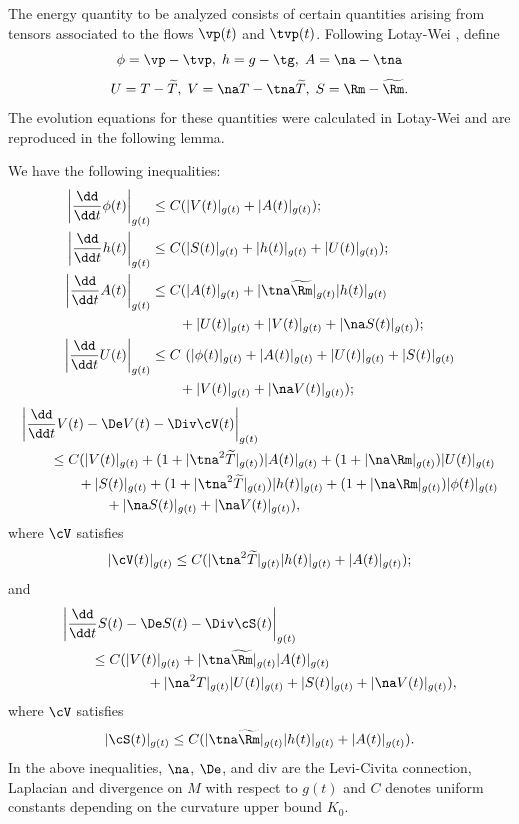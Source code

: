 \documentclass[hidelinks, 12pt, oneside, reqno]{amsart}
\begin{document}
The energy quantity to be analyzed consists of certain quantities arising from tensors associated to the flows $\vp(t)$ and $\tvp(t)$. Following Lotay-Wei \cite[\S 6.1]{LotayWeiLaplacianFlow}, define
\[
\phi = \vp - \tvp, \; h = g - \tg, \; A = \na - \tna 
\]
\[
U = T- \widetilde T, \; V = \na T - \tna \widetilde T, \; S = \Rm - \widetilde \Rm.
\]
The evolution equations for these quantities were calculated in Lotay-Wei and are reproduced in the following lemma.
\begin{lem}\label{lemma evolution equations differences}\cite[Lemma 6.2]{LotayWeiLaplacianFlow} We have the following inequalities:
\begin{align}
    \bigg| \frac{\dd }{\dd t} \phi(t) \bigg|_{g(t)} &\le C (|V(t)|_{g(t)} + |A(t)|_{g(t)}); \label{equation ev diff g2 structures} \\
    \bigg| \frac{\dd }{\dd t} h(t) \bigg|_{g(t)} &\le C (|S(t)|_{g(t)} +|h(t)|_{g(t)} + |U(t)|_{g(t)}); \label{equation ev diff metrics} \\
    \bigg| \frac{\dd }{\dd t} A(t) \bigg|_{g(t)} &\le C(|A(t)|_{g(t)} +|\tna \widetilde \Rm|_{g(t)}|h(t)|_{g(t)} \nonumber \\
    &\qquad + |U(t)|_{g(t)} + |V(t)|_{g(t)} + |\na S (t)|_{g(t)}); \label{equation ev diff christoffels}\\
    \bigg| \frac{\dd }{\dd t} U(t) \bigg|_{g(t)} &\le C\ (|\phi(t)|_{g(t)} + |A(t)|_{g(t)} +|U(t)|_{g(t)} + |S(t)|_{g(t)} \nonumber \\
    &\qquad + |V(t)|_{g(t)} + |\na V (t)|_{g(t)}); \label{equation ev diff torsions}
\end{align}
\begin{align}
    &\bigg| \frac{\dd }{\dd t} V(t)  - \De V(t) - \Div \cV(t) \bigg|_{g(t)} \nonumber \\
    &\qquad \le C (|V(t)|_{g(t)} +(1+|\tna^2\widetilde T|_{g(t)})|A(t)|_{g(t)} +(1+ |\na \Rm|_{g(t)})|U(t)|_{g(t)}  \nonumber \\ 
    &\qquad \qquad +|S(t)|_{g(t)} + (1+|\tna^2\widetilde T|_{g(t)})|h(t)|_{g(t)} +(1+ |\na \Rm|_{g(t)})|\phi(t)|_{g(t)} \nonumber \\
    &\qquad \qquad \qquad + |\na S (t)|_{g(t)} + |\na V (t)|_{g(t)}), \label{equation ev diff deriv tors} 
\end{align}
where $\cV$ satisfies 
\[
|\cV(t)|_{g(t)} \le C(|\tna^2 \widetilde T|_{g(t)}|h(t)|_{g(t)} + |A(t)|_{g(t)});
\]
and
\begin{align}
    &\bigg| \frac{\dd }{\dd t} S(t)  - \De S(t) - \Div \cS(t) \bigg|_{g(t)} \nonumber \\
    &\qquad \le C (|V(t)|_{g(t)} + |\tna \widetilde \Rm|_{g(t)}|A(t)|_{g(t)} \nonumber \\
    &\qquad \qquad \qquad +|\na^2 T|_{g(t)}|U(t)|_{g(t)} +|S(t)|_{g(t)} + |\na V (t)|_{g(t)}), \label{equation ev diff curvatures} 
\end{align}
where $\cV$ satisfies 
\[
|\cS(t)|_{g(t)} \le C(|\tna \widetilde \Rm|_{g(t)}|h(t)|_{g(t)} + |A(t)|_{g(t)}).
\]
In the above inequalities, $\na$, $\De$, and $\mathrm{div}$ are the Levi-Civita connection, Laplacian and divergence on $M$ with respect to $g(t)$ and $C$ denotes uniform constants depending on the curvature upper bound $K_0$.  
\end{lem}
\end{document}
